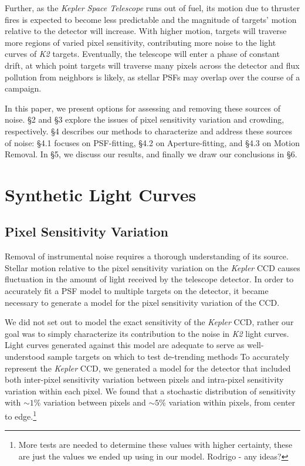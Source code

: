 \documentclass[12pt,preprint]{aastex}
\begin{document}
Further, as the \textit{Kepler Space Telescope} runs out of fuel, its motion due to thruster fires is expected to become less predictable and the magnitude of targets' motion relative to the detector will increase. With higher motion, targets will traverse more regions of varied pixel sensitivity, contributing more noise to the light curves of \textit{K2} targets. Eventually, the telescope will enter a phase of constant drift, at which point targets will traverse many pixels across the detector and flux pollution from neighbors is likely, as stellar PSFs may overlap over the course of a campaign.

In this paper, we present options for assessing and removing these sources of noise. \S 2 and \S 3 explore the issues of pixel sensitivity variation and crowding, respectively. \S 4 describes our methods to characterize and address these sources of noise: \S 4.1 focuses on PSF-fitting, \S 4.2 on Aperture-fitting, and \S 4.3 on Motion Removal. In \S 5, we discuss our results, and finally we draw our conclusions in \S 6.

\section{Synthetic Light Curves}

\subsection{Pixel Sensitivity Variation}

Removal of instrumental noise requires a thorough understanding of its source. Stellar motion relative to the pixel sensitivity variation on the \textit{Kepler} CCD causes fluctuation in the amount of light received by the telescope detector. In order to accurately fit a PSF model to multiple targets on the detector, it became necessary to generate a model for the pixel sensitivity variation of the CCD.

We did not set out to model the exact sensitivity of the \textit{Kepler} CCD, rather our goal was to simply characterize its contribution to the noise in \textit{K2} light curves. Light curves generated against this model are adequate to serve as well-understood sample targets on which to test de-trending methods To accurately represent the \textit{Kepler} CCD, we generated a model for the detector that included both inter-pixel sensitivity variation between pixels and intra-pixel sensitivity variation within each pixel. We found that a stochastic distribution of sensitivity with ${\sim}1\%$ variation between pixels and ${\sim}5\%$ variation within pixels, from center to edge.\footnote{More tests are needed to determine these values with higher certainty, these are just the values we ended up using in our model. Rodrigo - any ideas?}
\end{document}

